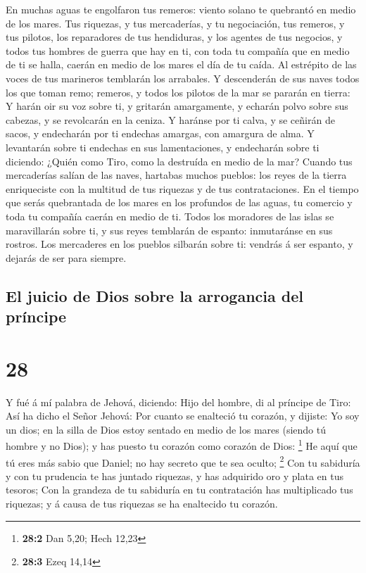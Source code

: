  En muchas aguas te engolfaron tus remeros: viento solano
te quebrantó en medio de los mares.  Tus riquezas, y tus
mercaderías, y tu negociación, tus remeros, y tus pilotos, los
reparadores de tus hendiduras, y los agentes de tus negocios, y todos
tus hombres de guerra que hay en ti, con toda tu compañía que en medio
de ti se halla, caerán en medio de los mares el día de tu caída.
 Al estrépito de las voces de tus marineros temblarán los
arrabales.  Y descenderán de sus naves todos los que
toman remo; remeros, y todos los pilotos de la mar se pararán en tierra:
 Y harán oir su voz sobre ti, y gritarán amargamente, y
echarán polvo sobre sus cabezas, y se revolcarán en la ceniza.
 Y haránse por ti calva, y se ceñirán de sacos, y
endecharán por ti endechas amargas, con amargura de alma.
 Y levantarán sobre ti endechas en sus lamentaciones, y
endecharán sobre ti diciendo: ¿Quién como Tiro, como la destruída en
medio de la mar?  Cuando tus mercaderías salían de las
naves, hartabas muchos pueblos: los reyes de la tierra enriqueciste con
la multitud de tus riquezas y de tus contrataciones.  En
el tiempo que serás quebrantada de los mares en los profundos de las
aguas, tu comercio y toda tu compañía caerán en medio de ti.
 Todos los moradores de las islas se maravillarán sobre
ti, y sus reyes temblarán de espanto: inmutaránse en sus rostros.
 Los mercaderes en los pueblos silbarán sobre ti: vendrás
á ser espanto, y dejarás de ser para siempre.

\hypertarget{el-juicio-de-dios-sobre-la-arrogancia-del-pruxedncipe}{%
\subsection{El juicio de Dios sobre la arrogancia del
príncipe}\label{el-juicio-de-dios-sobre-la-arrogancia-del-pruxedncipe}}

\hypertarget{section-27}{%
\section{28}\label{section-27}}

 Y fué á mí palabra de Jehová, diciendo: 
Hijo del hombre, di al príncipe de Tiro: Así ha dicho el Señor Jehová:
Por cuanto se enalteció tu corazón, y dijiste: Yo soy un dios; en la
silla de Dios estoy sentado en medio de los mares (siendo tú hombre y no
Dios); y has puesto tu corazón como corazón de Dios: \footnote{\textbf{28:2}
  Dan 5,20; Hech 12,23}  He aquí que tú eres más sabio que
Daniel; no hay secreto que te sea oculto; \footnote{\textbf{28:3} Ezeq
  14,14}  Con tu sabiduría y con tu prudencia te has
juntado riquezas, y has adquirido oro y plata en tus tesoros;
 Con la grandeza de tu sabiduría en tu contratación has
multiplicado tus riquezas; y á causa de tus riquezas se ha enaltecido tu
corazón.


